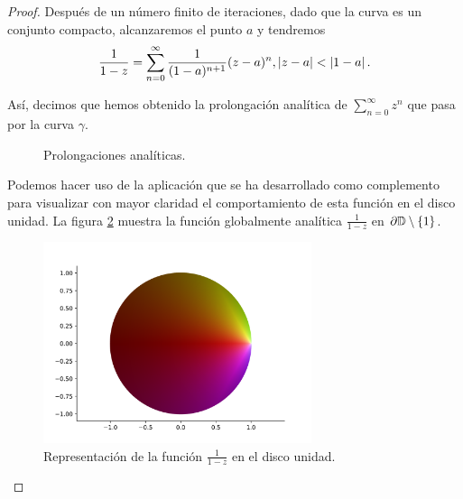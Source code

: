 \begin{proof}
Después de un número finito de iteraciones, dado que la curva es un conjunto compacto, alcanzaremos el punto $a$ y tendremos
\begin{equation*}
    \frac{1}{1-z} = \sum_{n=0}^{\infty} \frac{1}{(1 - a)^{n+1}} (z - a)^n , \left\lvert z - a\right\rvert < \left\lvert1 - a\right\rvert.
\end{equation*}

Así, decimos que hemos obtenido la prolongación analítica de $\sum_{n=0}^{\infty} z^n$ que pasa por la curva $\gamma$. \\

\begin{figure}[h]{}
    \centering
    \caption{Prolongaciones analíticas.}
    \label{fig:prolongacion}
\end{figure}

Podemos hacer uso de la aplicación que se ha desarrollado como complemento para visualizar con mayor claridad el comportamiento de esta función en el disco unidad. La figura \ref{fig:ejemplo1} muestra la función globalmente analítica $\frac{1}{1-z}$ en $\partial \mathbb{D} \setminus \{1\}$. \\

\begin{figure}[h]
    \centering
    \includegraphics[width=0.7\textwidth]{../Aplicacion/1:(1-z).png}
    \caption{Representación de la función $\frac{1}{1-z}$ en el disco unidad.}
    \label{fig:ejemplo1}
\end{figure}
\end{proof}

